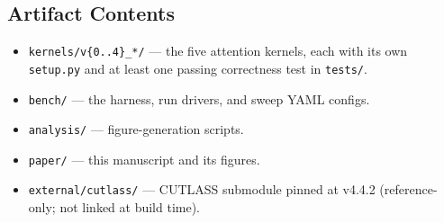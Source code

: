 \documentclass[conference]{IEEEtran}
\begin{document}
\subsection{Artifact Contents}

\begin{itemize}
  \item \texttt{kernels/v\{0..4\}\_*/} --- the five attention kernels,
        each with its own \texttt{setup.py} and at least one passing
        correctness test in \texttt{tests/}.
  \item \texttt{bench/} --- the harness, run drivers, and sweep YAML
        configs.
  \item \texttt{analysis/} --- figure-generation scripts.
  \item \texttt{paper/} --- this manuscript and its figures.
  \item \texttt{external/cutlass/} --- CUTLASS submodule pinned at
        v4.4.2 (reference-only; not linked at build time).
\end{itemize}
\end{document}
